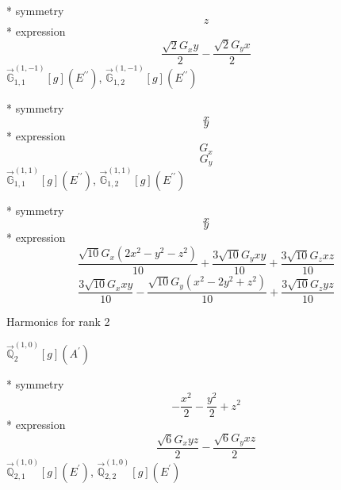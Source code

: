 \documentclass[fleqn,8pt]{jsarticle}
\begin{document}
\noindent\quad ** symmetry
\begin{dmath*}
z
\end{dmath*}
\noindent\quad ** expression
\begin{dmath*}
\frac{\sqrt{2} G_{x} y}{2} - \frac{\sqrt{2} G_{y} x}{2}
\end{dmath*}
\noindent\quad $\vec{\mathbb{G}}_{1,1}^{(1,-1)}[g](E^{\prime\prime})$, $\vec{\mathbb{G}}_{1,2}^{(1,-1)}[g](E^{\prime\prime})$

\noindent\quad ** symmetry
\begin{dmath*}
x
\end{dmath*}
\begin{dmath*}
y
\end{dmath*}
\noindent\quad ** expression
\begin{dmath*}
G_{x}
\end{dmath*}
\begin{dmath*}
G_{y}
\end{dmath*}
\noindent\quad $\vec{\mathbb{G}}_{1,1}^{(1,1)}[g](E^{\prime\prime})$, $\vec{\mathbb{G}}_{1,2}^{(1,1)}[g](E^{\prime\prime})$

\noindent\quad ** symmetry
\begin{dmath*}
x
\end{dmath*}
\begin{dmath*}
y
\end{dmath*}
\noindent\quad ** expression
\begin{dmath*}
\frac{\sqrt{10} G_{x} \left(2 x^{2} - y^{2} - z^{2}\right)}{10} + \frac{3 \sqrt{10} G_{y} x y}{10} + \frac{3 \sqrt{10} G_{z} x z}{10}
\end{dmath*}
\begin{dmath*}
\frac{3 \sqrt{10} G_{x} x y}{10} - \frac{\sqrt{10} G_{y} \left(x^{2} - 2 y^{2} + z^{2}\right)}{10} + \frac{3 \sqrt{10} G_{z} y z}{10}
\end{dmath*}

\noindent * Harmonics for rank 2

\noindent\quad $\vec{\mathbb{Q}}_{2}^{(1,0)}[g](A^{\prime})$

\noindent\quad ** symmetry
\begin{dmath*}
- \frac{x^{2}}{2} - \frac{y^{2}}{2} + z^{2}
\end{dmath*}
\noindent\quad ** expression
\begin{dmath*}
\frac{\sqrt{6} G_{x} y z}{2} - \frac{\sqrt{6} G_{y} x z}{2}
\end{dmath*}
\noindent\quad $\vec{\mathbb{Q}}_{2,1}^{(1,0)}[g](E^{\prime})$, $\vec{\mathbb{Q}}_{2,2}^{(1,0)}[g](E^{\prime})$
\end{document}
